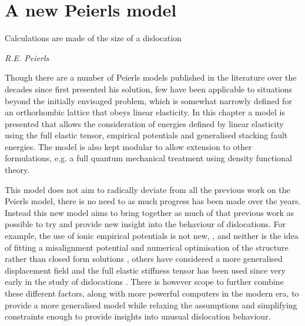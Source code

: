 
\chapter{A new Peierls model}
\label{chap:peierls_model}
\graphicspath{{peierls_model/Figs/}}

\epigraph{Calculations are made of the size of a dislocation}{\emph{R.E. Peierls}}


Though there are a number \cite{Nabarro1947,Huntington1955, puls1976, Vitek1992,  Bulatov1997, Lubarda2007, Clegg2006,Gouriet2015} of Peierls models published in the literature over the decades since \citet{Peierls1940} first presented his solution, few have been applicable to situations beyond the initially envisaged problem, which is somewhat narrowly defined for an orthorhombic lattice that obeys linear elasticity. In this chapter a model is presented that allows  the consideration of energies defined by linear elasticity using the full elastic tensor, empirical potentials and generalised stacking fault energies. The model is also kept modular to allow extension to other formulations, e.g. a full quantum mechanical treatment using density functional theory.

This model does not aim to radically deviate from all the previous work on the Peierls model, there is no need to as much progress has been made over the years. Instead this new model aims to bring together as much of that previous work as possible to try and provide new insight into the behaviour of dislocations. For example, the use of ionic empirical potentials is not new, \cite{Hoagland1976}, and neither is the idea of fitting a misalignment potential and numerical optimisation of the structure rather than closed form solutions \cite{Bulatov1997}, others have considered a more generalised displacement field \cite{Lubarda2007} and the full elastic stiffness tensor has been used since very early in the study of dislocations \cite{Eshelby1949}. There is however scope to further combine these different factors, along with more powerful computers in the modern era, to provide a more generalised model while relaxing the assumptions and simplifying constraints enough to provide insights into unusual dislocation behaviour.

